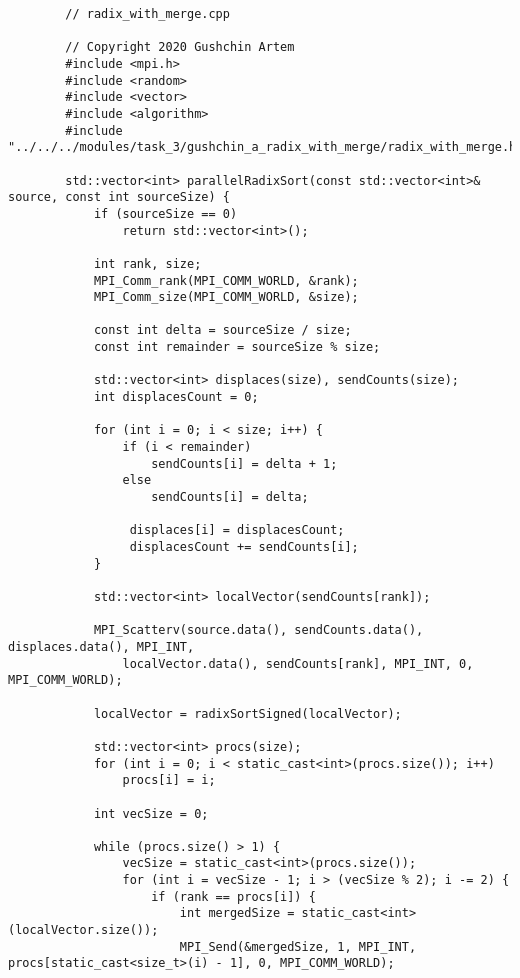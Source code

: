 \documentclass{report}
\begin{document}
	\begin{lstlisting}
		// radix_with_merge.cpp
		
		// Copyright 2020 Gushchin Artem
        #include <mpi.h>
        #include <random>
        #include <vector>
        #include <algorithm>
        #include "../../../modules/task_3/gushchin_a_radix_with_merge/radix_with_merge.h"
        
        std::vector<int> parallelRadixSort(const std::vector<int>& source, const int sourceSize) {
            if (sourceSize == 0)
                return std::vector<int>();
        
            int rank, size;
            MPI_Comm_rank(MPI_COMM_WORLD, &rank);
            MPI_Comm_size(MPI_COMM_WORLD, &size);
        
            const int delta = sourceSize / size;
            const int remainder = sourceSize % size;
        
            std::vector<int> displaces(size), sendCounts(size);
            int displacesCount = 0;
        
            for (int i = 0; i < size; i++) {
                if (i < remainder)
                    sendCounts[i] = delta + 1;
                else
                    sendCounts[i] = delta;
        
                 displaces[i] = displacesCount;
                 displacesCount += sendCounts[i];
            }
        
            std::vector<int> localVector(sendCounts[rank]);
        
            MPI_Scatterv(source.data(), sendCounts.data(), displaces.data(), MPI_INT,
                localVector.data(), sendCounts[rank], MPI_INT, 0, MPI_COMM_WORLD);
        
            localVector = radixSortSigned(localVector);
        
            std::vector<int> procs(size);
            for (int i = 0; i < static_cast<int>(procs.size()); i++)
                procs[i] = i;
        
            int vecSize = 0;
        
            while (procs.size() > 1) {
                vecSize = static_cast<int>(procs.size());
                for (int i = vecSize - 1; i > (vecSize % 2); i -= 2) {
                    if (rank == procs[i]) {
                        int mergedSize = static_cast<int>(localVector.size());
                        MPI_Send(&mergedSize, 1, MPI_INT, procs[static_cast<size_t>(i) - 1], 0, MPI_COMM_WORLD);
        

\end{lstlisting}
\end{document}
